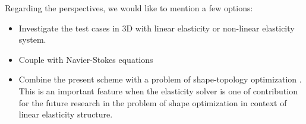 \documentclass[notitlepage,a4paper,fleqn,9pt]{icmfarticle}
\begin{document}
\begin{multicols}{2}
Regarding the perspectives, we would like to mention a few options:
\begin{itemize}
   \item Investigate the test cases in 3D with linear elasticity or non-linear elasticity system. 
   \item Couple with Navier-Stokes equations
   \item Combine the present scheme with a problem of shape-topology optimization \cite{AJT04}. This is an important feature when the elasticity solver is one of contribution for the future research in the problem of shape optimization in context of linear elasticity structure.
\end{itemize}

%

\vfill
\end{multicols}
\end{document}
